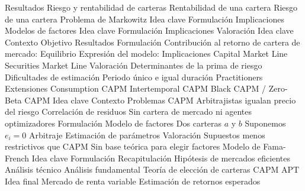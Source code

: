 \documentclass{nuevotema}
\begin{document}
\begin{esquema}[enumerate]
			\3 Resultados
		\2 Riesgo y rentabilidad de carteras
			\3 Rentabilidad de una cartera
			\3 Riesgo de una cartera
		\2 Problema de Markowitz
			\3 Idea clave
			\3 Formulación
			\3 Implicaciones
		\2 Modelos de factores
			\3 Idea clave
			\3 Formulación
			\3 Implicaciones
			\3 Valoración
	\1 
		\2 Idea clave
			\3 Contexto
			\3 Objetivo
			\3 Resultados
		\2 Formulación
			\3 Contribución al retorno de cartera de mercado:
			\3 Equilibrio
			\3 Expresión del modelo:
		\2 Implicaciones
			\3 Capital Market Line
			\3 Securities Market Line
		\2 Valoración
			\3 Determinantes de la prima de riesgo
			\3 Dificultades de estimación
			\3 Periodo único e igual duración
			\3 Practitioners
		\2 Extensiones
			\3 Consumption CAPM
			\3 Intertemporal CAPM
			\3 Black CAPM / Zero-Beta CAPM
	\1 
		\2 Idea clave
			\3 Contexto
			\3 Problemas CAPM
			\3 Arbitrajistas igualan precio del riesgo
			\3 Correlación de residuos
			\3 Sin cartera de mercado ni agentes optimizadores
		\2 Formulación
			\3 Modelo de factores
			\3 Dos carteras $a$ y $b$
			\3 Suponemos $e_i=0$
			\3 Arbitraje
			\3 Estimación de parámetros
		\2 Valoración
			\3 Supuestos menos restrictivos que CAPM
			\3 Sin base teórica para elegir factores
		\2 Modelo de Fama-French
			\3 Idea clave
			\3 Formulación
	\1[] 
		\2 Recapitulación
			\3 Hipótesis de mercados eficientes
			\3 Análisis técnico
			\3 Análisis fundamental
			\3 Teoría de elección de carteras
			\3 CAPM
			\3 APT
		\2 Idea final
			\3 Mercado de renta variable
			\3 Estimación de retornos esperados

\end{esquema}

\esquemalargo
\end{document}
